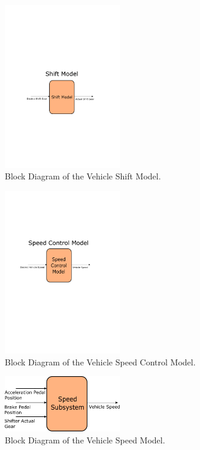 \documentclass[12pt]{article} %
\begin{document}
%
\begin{figure}
    \centering
    \captionsetup{justification=centering, margin=3cm}
    \includegraphics[width=2in]{figs/inkscape/shiftModelArchitecture}
    \caption{Block Diagram of the Vehicle Shift Model.}
    \label{fig:shiftBlockDiag}
\end{figure}
%
\begin{figure}
    \centering
    \captionsetup{justification=centering, margin=3cm}
    \includegraphics[width=2in]{figs/inkscape/speedControlModelArchitecture}
    \caption{Block Diagram of the Vehicle Speed Control Model.}
    \label{fig:cruiseBlockDiag}
\end{figure}
%
\begin{figure}
    \centering
    \captionsetup{justification=centering, margin=3cm}
    \includegraphics[width=2in]{figs/inkscape/speedModelArchitecture}
    \caption{Block Diagram of the Vehicle Speed Model.}
    \label{fig:speedBlockDiag}
\end{figure}
%
\end{document}
